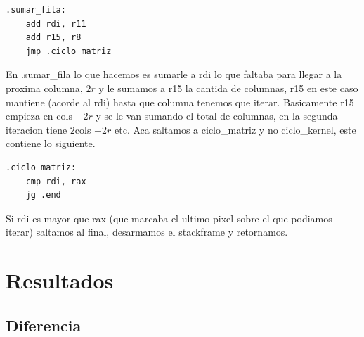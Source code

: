 \documentclass[a4paper]{article}
\begin{document}
\begin{codesnippet}
\begin{verbatim}
.sumar_fila:
    add rdi, r11                 
    add r15, r8                    
    jmp .ciclo_matriz
\end{verbatim}
\end{codesnippet}

 En .sumar\_fila lo que hacemos es sumarle a rdi lo que faltaba para llegar a la proxima columna, $2r$ y le sumamos a r15 la cantida de columnas, r15 en este caso mantiene (acorde al rdi) hasta que columna tenemos que iterar. Basicamente r15 empieza en cols $-2r$ y se le van sumando el total de columnas, en la segunda iteracion tiene $2$cols $-2r$ etc. Aca saltamos a ciclo\_matriz y no ciclo\_kernel, este contiene lo siguiente.

\begin{codesnippet}
\begin{verbatim}
.ciclo_matriz:
    cmp rdi, rax                       
    jg .end
\end{verbatim}
\end{codesnippet}

 Si rdi es mayor que rax (que marcaba el ultimo pixel sobre el que podiamos iterar) saltamos al final, desarmamos el stackframe y retornamos.

\section{Resultados}

\subsection{Diferencia}
\end{document}

